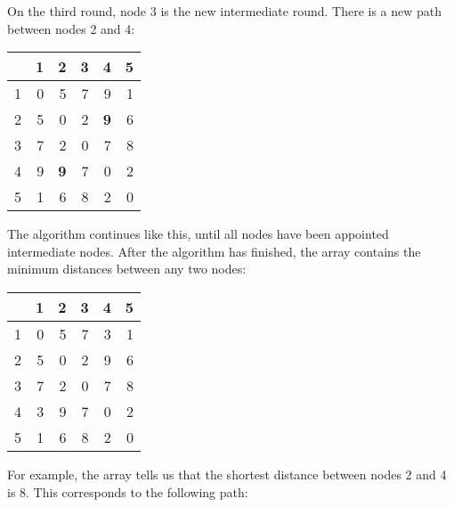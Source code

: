 On the third round, node 3 is the new intermediate round.
There is a new path between nodes 2 and 4:

\begin{center}
\begin{tabular}{r|rrrrr}
 & 1 & 2 & 3 & 4 & 5 \\
\hline
1 & 0 & 5 & 7 & 9 & 1 \\
2 & 5 & 0 & 2 & \textbf{9} & 6 \\
3 & 7 & 2 & 0 & 7 & 8 \\
4 & 9 & \textbf{9} & 7 & 0 & 2 \\
5 & 1 & 6 & 8 & 2 & 0 \\
\end{tabular}
\end{center}
\vspace{10pt}

The algorithm continues like this,
until all nodes have been appointed intermediate nodes.
After the algorithm has finished, the array contains
the minimum distances between any two nodes:

\begin{center}
\begin{tabular}{r|rrrrr}
 & 1 & 2 & 3 & 4 & 5 \\
\hline
1 & 0 & 5 & 7 & 3 & 1 \\
2 & 5 & 0 & 2 & 9 & 6 \\
3 & 7 & 2 & 0 & 7 & 8 \\
4 & 3 & 9 & 7 & 0 & 2 \\
5 & 1 & 6 & 8 & 2 & 0 \\
\end{tabular}
\end{center}

For example, the array tells us that the
shortest distance between nodes 2 and 4 is 8.
This corresponds to the following path:

\begin{center}
\end{center}

